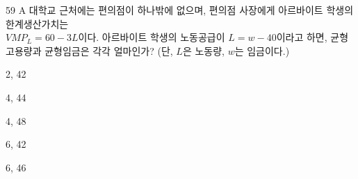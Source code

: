 \begin{question}{59}
A 대학교 근처에는 편의점이 하나밖에 없으며, 편의점 사장에게 아르바이트 학생의 한계생산가치는 \\
${ VMP_{ L } =60-3L }$이다. 아르바이트 학생의 노동공급이 ${ L=w-40 }$이라고 하면, 균형고용량과 균형임금은 각각 얼마인가? (단, ${ L }$은 노동량, ${ w }$는 임금이다.)
\begin{choices}
  \item 2, 42
  \item 4, 44
  \item 4, 48
  \item 6, 42
  \item 6, 46
\end{choices}
\end{question}
